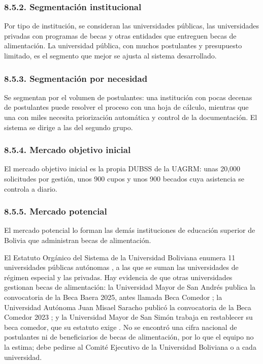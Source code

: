 \subsubsection{8.5.2. Segmentación institucional}

Por tipo de institución, se consideran las universidades públicas, las universidades privadas con programas de becas y otras entidades que entreguen becas de alimentación. La universidad pública, con muchos postulantes y presupuesto limitado, es el segmento que mejor se ajusta al sistema desarrollado.

\subsubsection{8.5.3. Segmentación por necesidad}

Se segmentan por el volumen de postulantes: una institución con pocas decenas de postulantes puede resolver el proceso con una hoja de cálculo, mientras que una con miles necesita priorización automática y control de la documentación. El sistema se dirige a las del segundo grupo.

\subsubsection{8.5.4. Mercado objetivo inicial}

El mercado objetivo inicial es la propia DUBSS de la UAGRM: unas 20,000 solicitudes por gestión, unos 900 cupos y unos 900 becados cuya asistencia se controla a diario.

\subsubsection{8.5.5. Mercado potencial}

El mercado potencial lo forman las demás instituciones de educación superior de Bolivia que administran becas de alimentación.

El Estatuto Orgánico del Sistema de la Universidad Boliviana enumera 11 universidades públicas autónomas \parencite{ceubestatuto}, a las que se suman las universidades de régimen especial y las privadas. Hay evidencia de que otras universidades gestionan becas de alimentación: la Universidad Mayor de San Andrés publica la convocatoria de la Beca Baera 2025, antes llamada Beca Comedor \parencite{umsabaera2025}; la Universidad Autónoma Juan Misael Saracho publicó la convocatoria de la Beca Comedor 2023 \parencite{uajms2023comedor}; y la Universidad Mayor de San Simón trabaja en restablecer su beca comedor, que su estatuto exige \parencite{lostiemposumss2025}. No se encontró una cifra nacional de postulantes ni de beneficiarios de becas de alimentación, por lo que el equipo no la estima; debe pedirse al Comité Ejecutivo de la Universidad Boliviana o a cada universidad.

